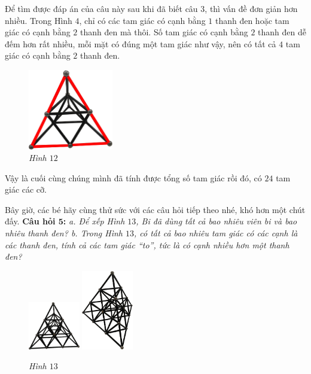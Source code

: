 	\vskip 0.1cm
	\begin{multicols}{2}
		Để tìm được đáp án của câu này sau khi đã biết câu $3$, thì vấn đề đơn giản hơn nhiều. Trong Hình $4$, chỉ có các tam giác có cạnh bằng $1$  thanh đen hoặc tam giác có cạnh bằng $2$ thanh đen mà thôi. Số tam giác có cạnh bằng $2$ thanh đen dễ đếm hơn rất nhiều, mỗi mặt có đúng một tam giác như vậy, nên có tất cả $4$ tam giác có cạnh bằng $2$ thanh đen.
		\begin{figure}[H]
			\centering
			\vspace*{-5pt}
			\captionsetup{labelformat= empty, justification=centering} \includegraphics[width=0.33\textwidth]{12}
			\caption{\small\textit{Hình $12$}}
			\vspace*{-5pt}
		\end{figure}
	\end{multicols}
	Vậy là cuối cùng chúng mình đã tính được tổng số tam giác rồi đó, có $24$ tam giác các cỡ.
	\vskip 0.1cm
	\begin{multicols}{2}
	Bây giờ, các bé hãy cùng thử sức với các câu hỏi tiếp theo nhé, khó hơn một chút đấy.%
	\vskip 0.1cm
	\textbf{Câu hỏi $\pmb{5}$:} \textit{a. Để xếp Hình $13$, Bi đã dùng tất cả bao nhiêu viên bi và bao nhiêu thanh đen? 
			\vskip 0.1cm
			b. Trong Hình $13$, có tất cả bao nhiêu tam giác có các cạnh là các thanh đen, tính cả các tam giác “to”, tức là có cạnh nhiều hơn một thanh đen?}
	\begin{figure}[H]
		\centering
		\vspace*{5pt}
		\captionsetup{labelformat= empty, justification=centering} \includegraphics[width=0.2\textwidth]{13}
		\quad
		\includegraphics[width=0.2\textwidth]{13a}
		\caption{\small\textit{Hình $13$}}
		\vspace*{-5pt}
	\end{figure}
	\end{multicols}







